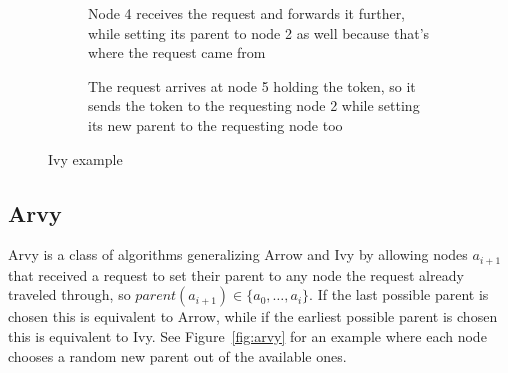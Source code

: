 \documentclass[a4paper, oneside]{discothesis}
\begin{document}
\begin{figure}[H]
\begin{subfigure}[t]{0.5\textwidth}
\centering
{}
\caption{Node 4 receives the request and forwards it further, while setting its parent to node 2 as well because that's where the request came from}
\end{subfigure}
\quad
\begin{subfigure}[t]{0.5\textwidth}
\centering
{}
\caption{The request arrives at node 5 holding the token, so it sends the token to the requesting node 2 while setting its new parent to the requesting node too}
\end{subfigure}
\caption{Ivy example}
\label{fig:ivy}
\end{figure}

\subsection{Arvy}

Arvy is a class of algorithms generalizing Arrow and Ivy by allowing nodes $a_{i+1}$ that received a request to set their parent to any node the request already traveled through, so $parent(a_{i+1})\in\{a_{0},\dots,a_{i}\}$. If the last possible parent is chosen this is equivalent to Arrow, while if the earliest possible parent is chosen this is equivalent to Ivy. See Figure~\ref{fig:arvy} for an example where each node chooses a random new parent out of the available ones.
\end{document}
